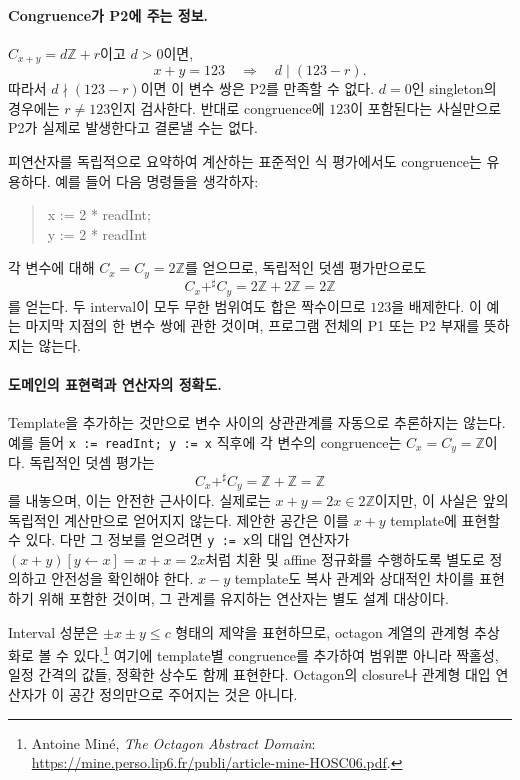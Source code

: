 \documentclass[a4paper,10pt]{article}
\begin{document}
\paragraph{Congruence가 P2에 주는 정보.}
$C_{x+y}=d\mathbb Z+r$이고 $d>0$이면,
\[
 x+y=123\quad\Longrightarrow\quad d\mid(123-r).
\]
따라서 $d\nmid(123-r)$이면 이 변수 쌍은 P2를 만족할 수 없다.
$d=0$인 singleton의 경우에는 $r\ne123$인지 검사한다.
반대로 congruence에 $123$이 포함된다는 사실만으로
P2가 실제로 발생한다고 결론낼 수는 없다.

피연산자를 독립적으로 요약하여 계산하는 표준적인 식 평가에서도
congruence는 유용하다. 예를 들어 다음 명령들을 생각하자:
\begin{quote}\ttfamily
 x := 2 * readInt;\\
 y := 2 * readInt
\end{quote}
각 변수에 대해 $C_x=C_y=2\mathbb Z$를 얻으므로,
독립적인 덧셈 평가만으로도
\[
 C_x+^\sharp C_y=2\mathbb Z+2\mathbb Z=2\mathbb Z
\]
를 얻는다. 두 interval이 모두 무한 범위여도 합은 짝수이므로 $123$을 배제한다.
이 예는 마지막 지점의 한 변수 쌍에 관한 것이며,
프로그램 전체의 P1 또는 P2 부재를 뜻하지는 않는다.

\paragraph{도메인의 표현력과 연산자의 정확도.}
Template을 추가하는 것만으로 변수 사이의 상관관계를 자동으로 추론하지는 않는다.
예를 들어 \texttt{x := readInt; y := x} 직후에
각 변수의 congruence는 $C_x=C_y=\mathbb Z$이다.
독립적인 덧셈 평가는
\[
 C_x+^\sharp C_y=\mathbb Z+\mathbb Z=\mathbb Z
\]
를 내놓으며, 이는 안전한 근사이다.
실제로는 $x+y=2x\in2\mathbb Z$이지만,
이 사실은 앞의 독립적인 계산만으로 얻어지지 않는다.
제안한 공간은 이를 $x+y$ template에 표현할 수 있다.
다만 그 정보를 얻으려면 \texttt{y := x}의 대입 연산자가
$(x+y)[y\leftarrow x]=x+x=2x$처럼 치환 및 affine 정규화를 수행하도록
별도로 정의하고 안전성을 확인해야 한다.
$x-y$ template도 복사 관계와 상대적인 차이를 표현하기 위해 포함한 것이며,
그 관계를 유지하는 연산자는 별도 설계 대상이다.

Interval 성분은 $\pm x\pm y\le c$ 형태의 제약을 표현하므로,
octagon 계열의 관계형 추상화로 볼 수 있다.\footnote{Antoine Min\'e,
\emph{The Octagon Abstract Domain}:
\url{https://mine.perso.lip6.fr/publi/article-mine-HOSC06.pdf}.}
여기에 template별 congruence를 추가하여 범위뿐 아니라
짝홀성, 일정 간격의 값들, 정확한 상수도 함께 표현한다.
Octagon의 closure나 관계형 대입 연산자가 이 공간 정의만으로 주어지는 것은 아니다.
\end{document}
